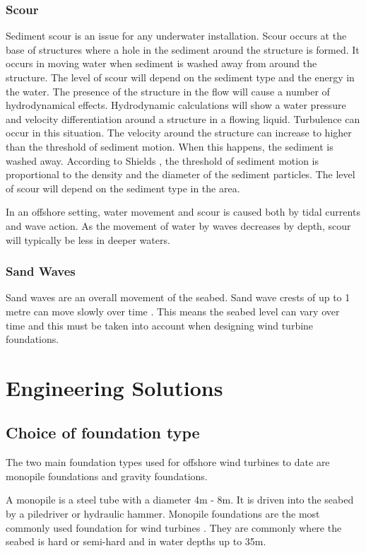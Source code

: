 \documentclass[12pt]{article} %
\begin{document}
\subsubsection{Scour}
Sediment scour is an issue for any underwater installation. Scour occurs at the base of structures where a hole in the sediment around the structure is formed. It occurs in moving water when sediment is washed away from around the structure.
The level of scour will depend on the sediment type and the energy in the water. 
The presence of the structure in the flow will cause a number 
of hydrodynamical effects. Hydrodynamic calculations will show a water pressure and velocity differentiation around a structure in a flowing liquid. Turbulence can occur in this situation. 
The velocity around the structure can increase to higher than the threshold of sediment motion. When this happens, the sediment is washed away.
According to Shields \cite{shields_application_1936}, the threshold of sediment motion is proportional to the density and the diameter of the sediment particles. The level of scour will depend on the sediment type in the area.

In an offshore setting, water movement and scour is caused both by tidal currents and wave action.
As the movement of water by waves decreases by depth, scour will typically be less in deeper waters.

\subsubsection{Sand Waves}
Sand waves are an overall movement of the seabed. Sand wave crests of up to 1 metre can move slowly over time \cite{byrneocleirigh}. This means the seabed level can vary over time and this must be taken into account when designing wind turbine foundations.


\section{Engineering Solutions}

\subsection{Choice of foundation type}

The two main foundation types used for offshore wind turbines to date are monopile foundations and gravity foundations.

A monopile is a steel tube with a diameter 4m - 8m. It is driven into the seabed by a piledriver or hydraulic hammer. Monopile foundations are the most commonly used foundation for wind turbines \cite{4Coffshore:1}. They are commonly where the seabed is hard or semi-hard and in water depths up to 35m.
\end{document}
